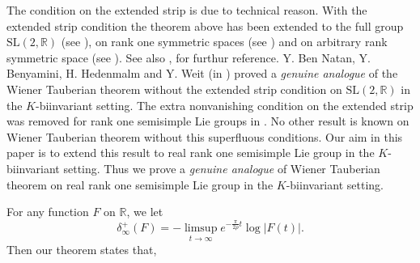 \documentclass[11pt,reqno]{amsart}
\newcommand{\R}{\mathbb R}%
\theoremstyle{definition}
\theoremstyle{definition}
\numberwithin{equation}{section}
\begin{document}
The condition on the extended strip is due to technical reason. With the extended strip condition
the theorem above has been extended to the full group $\mathrm{SL}(2, \R)$ (see \cite{Sarkar-1997}), on rank one symmetric spaces (see \cite{Sarkar-1998}) and on arbitrary rank symmetric space (see \cite{Sitaram-1980}).  See also \cite{Sitaram-1988}, \cite{Naru-2009, Naru-2011} for furthur reference. Y. Ben Natan, Y. Benyamini, H. Hedenmalm and Y. Weit (in \cite{Ben-1, Ben-2}) proved a {\em genuine analogue}  of  the Wiener Tauberian theorem without the extended strip condition on $\mathrm{SL}(2,\R)$ in the $K$-biinvariant setting.  The extra nonvanishing condition on the  extended strip was removed for rank one semisimple Lie groups in \cite{Pusti-2011}.  No other result  is known on  Wiener Tauberian theorem without this superfluous  conditions. Our aim in this paper is to extend this result  to real rank one semisimple Lie group in the $K$-biinvariant setting. Thus we prove a {\em genuine analogue} of Wiener Tauberian theorem on real rank one semisimple Lie group in the $K$-biinvariant setting.

For any function $F$ on $\R$, we let $$\delta_\infty^+(F)=-\limsup_{t\rightarrow\infty} e^{-\frac{\pi}{2\rho}t}\log|F(t)|.$$  Then our theorem states that,
\end{document}
